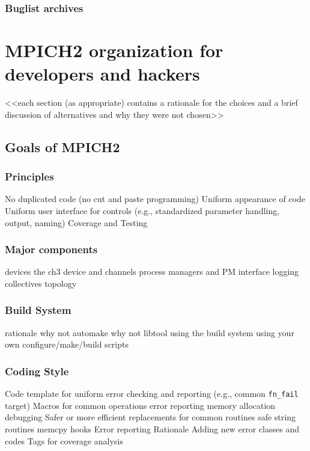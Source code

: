 \documentclass{report}
\begin{document}
\section{Buglist archives}


\part{MPICH2 organization for developers and hackers}


    <<each section (as appropriate) contains a rationale for the choices and a brief discussion of alternatives and why they were not chosen>>

\chapter{Goals of MPICH2}


\section{Principles}
         No duplicated code (no cut and paste programming) 
         Uniform appearance of code
         Uniform user interface for controls (e.g., standardized parameter handling, output, naming)
         Coverage and Testing

\section{Major components}
         devices
              the ch3 device and channels
         process managers and PM interface
         logging
         collectives
         topology

\section{Build System}
         rationale
              why not automake
              why not libtool
         using the build system
         using your own configure/make/build scripts

\section{Coding Style}
         Code template for uniform error checking and reporting (e.g., common \texttt{fn\_fail} target)
         Macros for common operations
              error reporting
              memory allocation
              debugging
         Safer or more efficient replacements for common routines
              safe string routines
              memcpy hooks
         Error reporting
              Rationale
               Adding new error classes and codes
         Tags for coverage analysis
\end{document}
